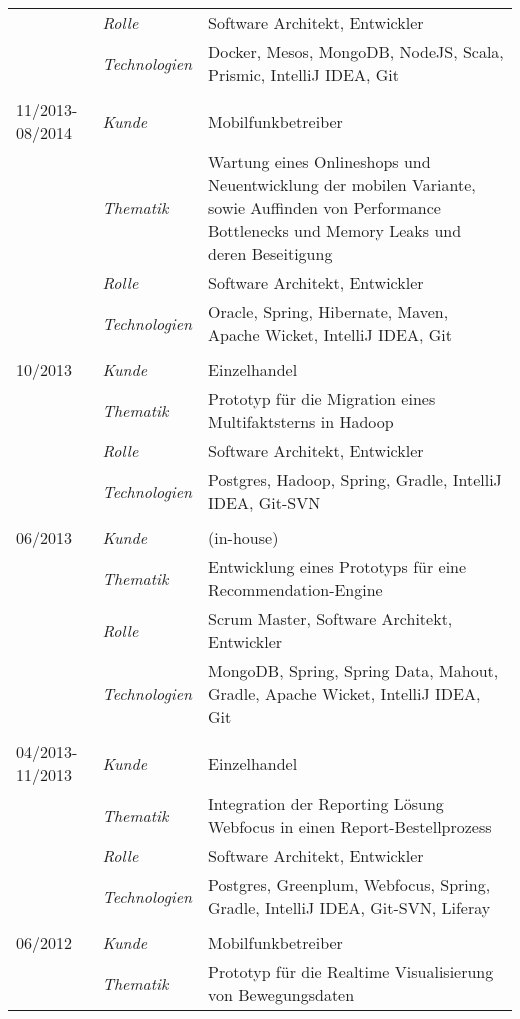 \begin{longtable}{@{}>{}p{4cm}>{\itshape}p{2cm}>{}p{9cm}}
\nopagebreak		& Rolle 	    & Software Architekt, Entwickler\\
\nopagebreak		& Technologien	& Docker, Mesos, MongoDB, NodeJS, Scala, Prismic, IntelliJ IDEA, Git\\
\\
11/2013-08/2014     & Kunde 	    & Mobilfunkbetreiber\\
\nopagebreak		& Thematik	    & Wartung eines Onlineshops und Neuentwicklung der mobilen Variante, sowie Auffinden von Performance Bottlenecks und Memory Leaks und deren Beseitigung\\
\nopagebreak		& Rolle 	    & Software Architekt, Entwickler\\
\nopagebreak		& Technologien	& Oracle, Spring, Hibernate, Maven, Apache Wicket, IntelliJ IDEA, Git\\
\\
10/2013             & Kunde 	    & Einzelhandel\\
\nopagebreak		& Thematik	    & Prototyp für die Migration eines Multifaktsterns in Hadoop\\
\nopagebreak		& Rolle 	    & Software Architekt, Entwickler\\
\nopagebreak		& Technologien	& Postgres, Hadoop, Spring, Gradle, IntelliJ IDEA, Git-SVN\\
\\
06/2013             & Kunde 	    & (in-house)\\
\nopagebreak		& Thematik	    & Entwicklung eines Prototyps für eine Recommendation-Engine\\
\nopagebreak		& Rolle 	    & Scrum Master, Software Architekt, Entwickler\\
\nopagebreak		& Technologien	& MongoDB, Spring, Spring Data, Mahout, Gradle, Apache Wicket, IntelliJ IDEA, Git\\
\\
04/2013-11/2013     & Kunde 	    & Einzelhandel\\
\nopagebreak		& Thematik	    & Integration der Reporting Lösung Webfocus in einen Report-Bestellprozess\\
\nopagebreak		& Rolle 	    & Software Architekt, Entwickler\\
\nopagebreak		& Technologien	& Postgres, Greenplum, Webfocus, Spring, Gradle, IntelliJ IDEA, Git-SVN, Liferay\\
\\
06/2012             & Kunde 	    & Mobilfunkbetreiber\\
\nopagebreak		& Thematik	    & Prototyp für die Realtime Visualisierung von Bewegungsdaten \\

\end{longtable}
